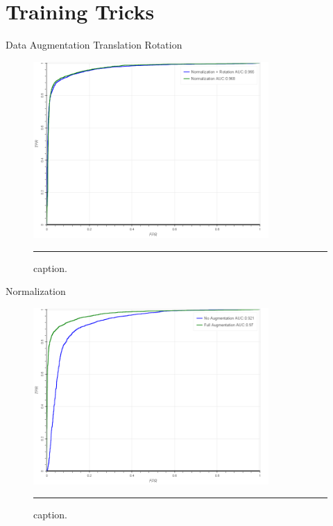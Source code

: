 \section{Training Tricks}

Data Augmentation
	Translation
    Rotation
    
    


    \begin{figure}[htbp]
  \centering
    \includegraphics[width = 0.8\textwidth]{./Figures/AUC_rotation_mdl0.png}
    \rule{35em}{0.5pt}
  \caption[Rotation Augmentation]{caption.}
  \label{fig:}
\end{figure}

    Normalization
    
\begin{figure}[htbp]
  \centering
    \includegraphics[width = 0.8\textwidth]{./Figures/AUC_augmentation_mdl0.png}
    \rule{35em}{0.5pt}
  \caption[Some vs. None Augmentation]{caption.}
  \label{fig:}
\end{figure}



